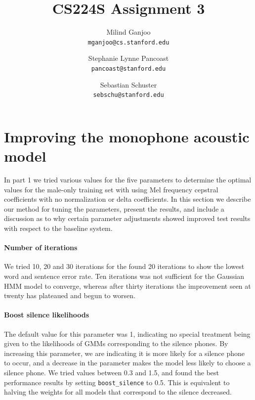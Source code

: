 \documentclass[twocolumn, 11pt]{article}
\title{CS224S Assignment 3}
\author{Milind Ganjoo\\\texttt{mganjoo@cs.stanford.edu}
\and%
Stephanie Lynne Pancoast\\\texttt{pancoast@stanford.edu}
\and%
Sebastian Schuster\\\texttt{sebschu@stanford.edu}}
\date{}
\begin{document}
\maketitle
\section{Improving the monophone acoustic model}

In part 1 we tried various values for the five parameters to determine the
optimal values for the male-only training set with using Mel frequency
cepstral coefficients with no normalization or delta coefficients. In this section we describe
our method for tuning the parameters, present the results, and include a
discussion as to why certain parameter adjustments showed improved test
results with respect to the baseline system.


\paragraph{Number of iterations}
We tried 10, 20 and 30 iterations for the found 20 iterations to show the
lowest word and sentence error rate. Ten iterations was not sufficient for the
Gaussian HMM model to converge, whereas after thirty iterations the
improvement seen at twenty has plateaued and begun to worsen. 


\paragraph{Boost silence likelihoods}
The default value for this parameter was 1, indicating no special treatment
being given to the likelihoods of GMMs corresponding to the silence phones. By
increasing this parameter, we are indicating it is more likely for a silence
phone to occur, and a decrease in the parameter makes the model less likely to
choose a silence phone. We tried values between 0.3 and 1.5, and found the
best performance results by setting \texttt{boost\_silence} to 0.5. This is equivalent
to halving the weights for all models that correspond to the silence
decreased.
\end{document}
